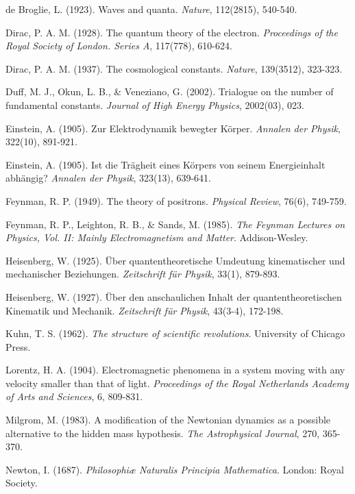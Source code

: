\documentclass[a4paper,12pt]{article}
\begin{document}
\begin{thebibliography}{99}
		 de Broglie, L. (1923). Waves and quanta. \textit{Nature}, 112(2815), 540-540.
		
		 Dirac, P. A. M. (1928). The quantum theory of the electron. \textit{Proceedings of the Royal Society of London. Series A}, 117(778), 610-624.
		
		 Dirac, P. A. M. (1937). The cosmological constants. \textit{Nature}, 139(3512), 323-323.
		
		 Duff, M. J., Okun, L. B., \& Veneziano, G. (2002). Trialogue on the number of fundamental constants. \textit{Journal of High Energy Physics}, 2002(03), 023.
		
		 Einstein, A. (1905). Zur Elektrodynamik bewegter Körper. \textit{Annalen der Physik}, 322(10), 891-921.
		
		 Einstein, A. (1905). Ist die Trägheit eines Körpers von seinem Energieinhalt abhängig? \textit{Annalen der Physik}, 323(13), 639-641.
		
		 Feynman, R. P. (1949). The theory of positrons. \textit{Physical Review}, 76(6), 749-759.
		
		 Feynman, R. P., Leighton, R. B., \& Sands, M. (1985). \textit{The Feynman Lectures on Physics, Vol. II: Mainly Electromagnetism and Matter}. Addison-Wesley.
		
		 Heisenberg, W. (1925). Über quantentheoretische Umdeutung kinematischer und mechanischer Beziehungen. \textit{Zeitschrift für Physik}, 33(1), 879-893.
		
		 Heisenberg, W. (1927). Über den anschaulichen Inhalt der quantentheoretischen Kinematik und Mechanik. \textit{Zeitschrift für Physik}, 43(3-4), 172-198.
		
		 Kuhn, T. S. (1962). \textit{The structure of scientific revolutions}. University of Chicago Press.
		
		 Lorentz, H. A. (1904). Electromagnetic phenomena in a system moving with any velocity smaller than that of light. \textit{Proceedings of the Royal Netherlands Academy of Arts and Sciences}, 6, 809-831.
		
		 Milgrom, M. (1983). A modification of the Newtonian dynamics as a possible alternative to the hidden mass hypothesis. \textit{The Astrophysical Journal}, 270, 365-370.
		
		 Newton, I. (1687). \textit{Philosophiæ Naturalis Principia Mathematica}. London: Royal Society.
		

\end{thebibliography}
\end{document}
